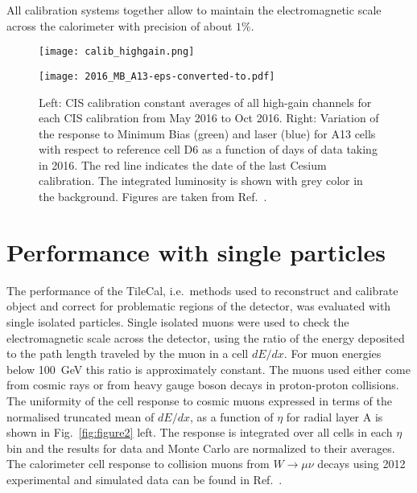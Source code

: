 \documentclass[10pt]{article}
\begin{document}
All calibration systems together allow to maintain the electromagnetic scale across the calorimeter with precision of about $1\%$.


\begin{figure}[t]
\begin{minipage}[c]{0.49\textwidth}
\texttt{[image: calib\_highgain.png]}
\end{minipage}
\hspace{5mm}
\begin{minipage}[c]{0.49\textwidth}
\texttt{[image: 2016\_MB\_A13-eps-converted-to.pdf]}
\end{minipage}
\caption{Left: CIS calibration constant averages of all high-gain channels for each CIS calibration from May 2016 to Oct 2016.
Right: Variation of the response to Minimum Bias (green) and laser (blue) for A13 cells with respect to reference cell D6 as a function of days of data taking in 2016. The red line indicates the date of the last Cesium calibration. The integrated luminosity is shown with grey color in the background. Figures are taken from Ref.~\cite{Calib}. }
\label{fig:figure1}
\end{figure}


\section{Performance with single particles}
The performance of the TileCal, i.e.~methods used to reconstruct and calibrate object and correct for problematic regions of the detector, was evaluated with single isolated particles. 
Single isolated muons were used to check the electromagnetic scale across the detector, using the ratio of the energy deposited to the path length traveled by the muon in a cell $dE/dx$.
For muon energies below 100~GeV this ratio is approximately constant.
The muons used either come from cosmic rays or from heavy gauge boson decays in proton-proton collisions. 
The uniformity of the cell response to cosmic muons \cite{4} expressed in terms of the normalised truncated mean of $dE/dx$, as a function of $\eta$ for radial layer A is shown in Fig.~\ref{fig:figure2} left. 
The response is integrated over all cells in each $\eta$ bin and the results for data and Monte Carlo are normalized to their averages.
The calorimeter cell response to collision muons from $W \rightarrow \mu \nu$ decays using 2012 experimental and simulated data can be found in Ref.~\cite{singleparticle}.
\end{document}
